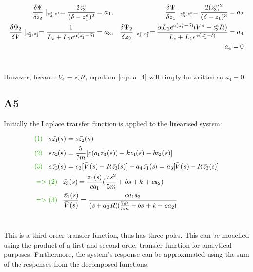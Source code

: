 \documentclass[a4paper,10pt,reqno]{amsart}
\numberwithin{equation}{section}
\begin{document}
\begin{align} %
    \frac{\delta\Psi}{\delta z_3}\mid_{z_3^e,z_1^e}=\frac{2z_3^e}{(\delta-z_1^e)^2}=a_1,
    &&
    \frac{\delta\Psi}{\delta z_1}\mid_{z_3^e,z_1^e}=\frac{2(z_3^e)^2}{(\delta-z_1)^3}=a_2
    \notag\\
    \frac{\delta\Psi_2}{\delta V}\mid_{z_3^e,z_1^e}=\frac{1}{L_o+L_1e^{\alpha(z_1^e-\delta)}}=a_3,
    &&
    \frac{\delta\Psi_2}{\delta z_3}\mid_{z_3^e,z_1^e}=\frac{\alpha L_1e^{\alpha(z_1^e-\delta)}(V^e-z_3^eR)}{L_o+L_1e^{\alpha(z_1^e-\delta)}}=a_4
    \label{eqn:a_4}\\
    &&a_4=0
    \notag
\end{align}
\\
\par However, because $V_e=z_3^eR$, equation~\ref{eqn:a_4} will simply be written as $a_4=0$.

\subsection{A5}\label{sec:A5} 

Initially the Laplace transfer function is applied to the linearised system:

\begin{align}
    &\color{darkGreen}(1)\color{black}\;\;\; s\bar{z_1}(s)= s\bar{z_2}(s)
    \\
    &\color{darkGreen}(2)\color{black}\;\;\; s\bar{z_2}(s) = \frac{5}{7m}[c(a_1\bar{z_3}(s))-k\bar{z_1}(s)-b\bar{z_2}(s)]
    \\
    &\color{darkGreen}(3)\color{black}\;\;\; s\bar{z_3}(s) = a_3[\bar{V}(s)-R\bar{z_3}(s)]-a_4\bar{z_1}(s) = a_3[\bar{V}(s)-R\bar{z_3}(s)]
    \\
    &\color{darkGreen}=>(2)\color{black}\;\;\; \bar{z_3}(s) = \frac{\bar{z_1}(s)}{ca_1}(\frac{7s^2}{5m}+bs+k+ca_2)
    \\
    &\color{darkGreen}=>(3)\color{black}\;\;\; \frac{\bar{z_1}(s)}{\bar{V}(s)} = \frac{ca_1a_3}{(s+a_3R)(\frac{7s^2}{5m}+bs+k-ca_2)}
\end{align}
\\
\par This is a third-order transfer function, thus has three poles. This can be modelled using the product of a first and second order transfer function for analytical purposes. Furthermore, the system's response can be approximated using the sum of the responses from the decomposed functions.
\end{document}
